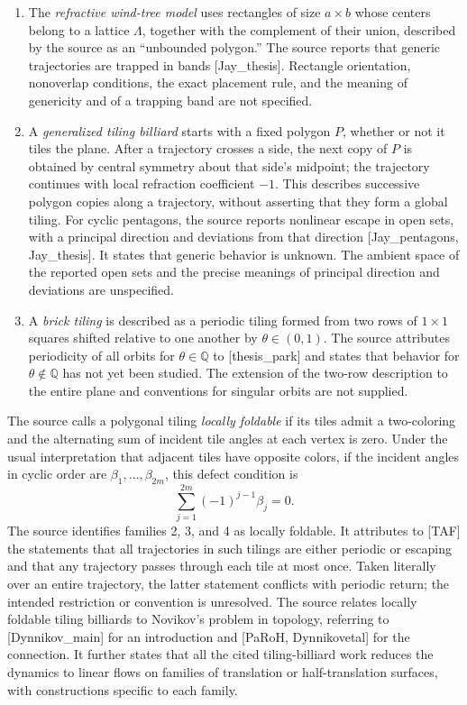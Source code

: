 \documentclass[11pt]{article}
\newcommand{\Q}{\mathbb{Q}}
\begin{document}
\begin{enumerate}
\item The \emph{refractive wind-tree model} uses rectangles of size \(a\times b\) whose centers belong to a lattice \(\Lambda\), together with the complement of their union, described by the source as an ``unbounded polygon.'' The source reports that generic trajectories are trapped in bands [Jay\_thesis]. Rectangle orientation, nonoverlap conditions, the exact placement rule, and the meaning of genericity and of a trapping band are not specified.
\item A \emph{generalized tiling billiard} starts with a fixed polygon \(P\), whether or not it tiles the plane. After a trajectory crosses a side, the next copy of \(P\) is obtained by central symmetry about that side's midpoint; the trajectory continues with local refraction coefficient \(-1\). This describes successive polygon copies along a trajectory, without asserting that they form a global tiling. For cyclic pentagons, the source reports nonlinear escape in open sets, with a principal direction and deviations from that direction [Jay\_pentagons, Jay\_thesis]. It states that generic behavior is unknown. The ambient space of the reported open sets and the precise meanings of principal direction and deviations are unspecified.
\item A \emph{brick tiling} is described as a periodic tiling formed from two rows of \(1\times1\) squares shifted relative to one another by \(\theta\in(0,1)\). The source attributes periodicity of all orbits for \(\theta\in\Q\) to [thesis\_park] and states that behavior for \(\theta\notin\Q\) has not yet been studied. The extension of the two-row description to the entire plane and conventions for singular orbits are not supplied.
\end{enumerate}

The source calls a polygonal tiling \emph{locally foldable} if its tiles admit a two-coloring and the alternating sum of incident tile angles at each vertex is zero. Under the usual interpretation that adjacent tiles have opposite colors, if the incident angles in cyclic order are \(\beta_1,\ldots,\beta_{2m}\), this defect condition is
\[
\sum_{j=1}^{2m}(-1)^{j-1}\beta_j=0.
\]
The source identifies families 2, 3, and 4 as locally foldable. It attributes to [TAF] the statements that all trajectories in such tilings are either periodic or escaping and that any trajectory passes through each tile at most once. Taken literally over an entire trajectory, the latter statement conflicts with periodic return; the intended restriction or convention is unresolved. The source relates locally foldable tiling billiards to Novikov's problem in topology, referring to [Dynnikov\_main] for an introduction and [PaRoH, Dynnikovetal] for the connection. It further states that all the cited tiling-billiard work reduces the dynamics to linear flows on families of translation or half-translation surfaces, with constructions specific to each family.
\end{document}
